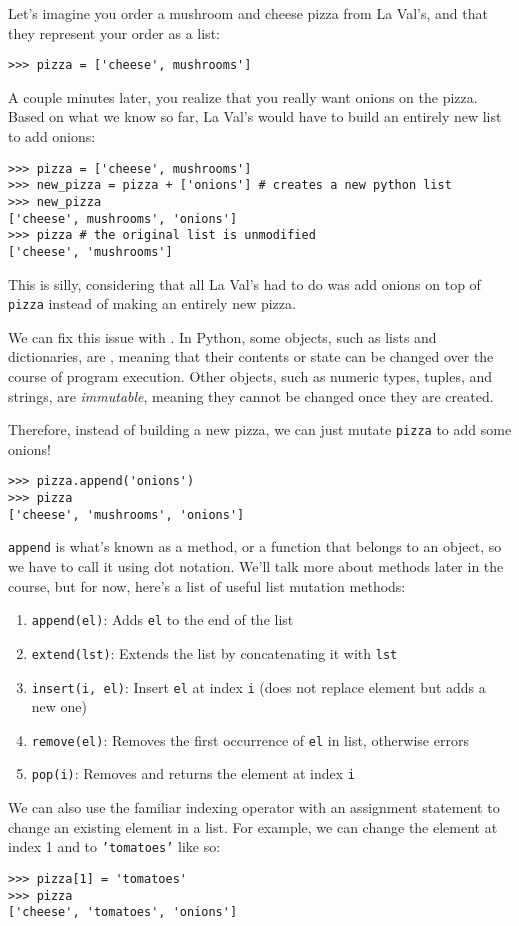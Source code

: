 Let's imagine you order a mushroom and cheese pizza from La Val's, and that
they represent your order as a list:

\begin{lstlisting}
>>> pizza = ['cheese', mushrooms']
\end{lstlisting}

A couple minutes later, you realize that you really want onions on the pizza.
Based on what we know so far, La Val's would have to build an entirely new list
to add onions:

\begin{lstlisting}
>>> pizza = ['cheese', mushrooms']
>>> new_pizza = pizza + ['onions'] # creates a new python list
>>> new_pizza
['cheese', mushrooms', 'onions']
>>> pizza # the original list is unmodified
['cheese', 'mushrooms']
\end{lstlisting}

This is silly, considering that all La Val's had to do was add onions on top of
{\tt pizza} instead of making an entirely new pizza.

We can fix this issue with . In Python, some objects,
such as lists and dictionaries, are , meaning that their
contents or state can be changed over the course of program execution. Other objects, such as
numeric types, tuples, and strings, are {\it immutable}, meaning they cannot be
changed once they are created.

Therefore, instead of building a new pizza, we can just mutate \texttt{pizza}
to add some onions!

\begin{lstlisting}
>>> pizza.append('onions')
>>> pizza
['cheese', 'mushrooms', 'onions']
\end{lstlisting}

\texttt{append} is what's known as a method, or a function that belongs to an
object, so we have to call it using dot notation. We'll talk more about methods 
later in the course, but for now, here's a list of useful list mutation methods:

\begin{enumerate}
\item {\tt append(el)}: Adds {\tt el} to the end of the list
\item {\tt extend(lst)}: Extends the list by concatenating it with {\tt lst}
\item {\tt insert(i, el)}: Insert {\tt el} at index {\tt i} (does not replace
element but adds a new one)
\item {\tt remove(el)}: Removes the first occurrence of {\tt el} in list,
otherwise errors
\item {\tt pop(i)}: Removes and returns the element at index {\tt i}
\end{enumerate}

We can also use the familiar indexing operator with an assignment statement to
change an existing element in a list. For example, we can change the element at index 1
and to \texttt{'tomatoes'} like so:

\begin{lstlisting}
>>> pizza[1] = 'tomatoes'
>>> pizza
['cheese', 'tomatoes', 'onions']
\end{lstlisting}
